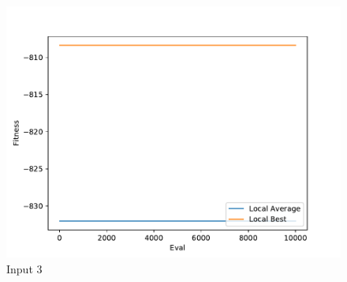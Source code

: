 \documentclass{standalone}
\begin{document}
\begin{figure}[!htb]
	\caption{Input 3}
	\label{fig:graph_3037}
	\includegraphics[width=\textwidth]{../graphs/graphs/3037.pdf}
\end{figure}
\end{document}
